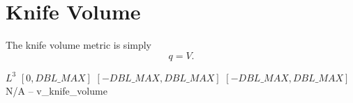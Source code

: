 \section{Knife Volume}

The knife volume metric is simply
\[
q = V.
\]

%
{$L^3$}%
{$[0,DBL\_MAX]$}%
{$[-DBL\_MAX,DBL\_MAX]$}%
{$[-DBL\_MAX,DBL\_MAX]$}%
{N/A}%
{--}%
{v\_knife\_volume}%
